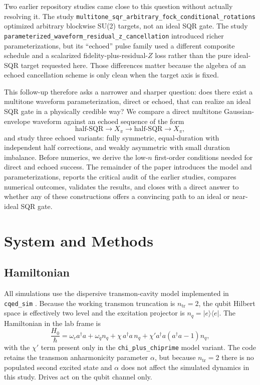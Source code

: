 \documentclass[aps,pra,twocolumn,reprint,floatfix,amsmath,amssymb]{revtex4-2}
\begin{document}
Two earlier repository studies came close to this question without actually resolving it. The study \texttt{multitone\_sqr\_arbitrary\_fock\_conditional\_rotations} optimized arbitrary blockwise SU(2) targets, not an ideal SQR gate. The study \texttt{parameterized\_waveform\_residual\_z\_cancellation} introduced richer parameterizations, but its ``echoed'' pulse family used a different composite schedule and a scalarized fidelity-plus-residual-$Z$ loss rather than the pure ideal-SQR target requested here. Those differences matter because the algebra of an echoed cancellation scheme is only clean when the target axis is fixed.

This follow-up therefore asks a narrower and sharper question: does there exist a multitone waveform parameterization, direct or echoed, that can realize an ideal SQR gate in a physically credible way? We compare a direct multitone Gaussian-envelope waveform against an echoed sequence of the form
\begin{equation}
\text{half-SQR}\rightarrow X_\pi\rightarrow \text{half-SQR}\rightarrow X_\pi,
\end{equation}
and study three echoed variants: fully symmetric, equal-duration with independent half corrections, and weakly asymmetric with small duration imbalance. Before numerics, we derive the low-$n$ first-order conditions needed for direct and echoed success. The remainder of the paper introduces the model and parameterizations, reports the critical audit of the earlier studies, compares numerical outcomes, validates the results, and closes with a direct answer to whether any of these constructions offers a convincing path to an ideal or near-ideal SQR gate.

\section{System and Methods}

\subsection{Hamiltonian}
All simulations use the dispersive transmon-cavity model implemented in \texttt{cqed\_sim} \cite{cqedsim2026}. Because the working transmon truncation is $n_{\mathrm{tr}}=2$, the qubit Hilbert space is effectively two level and the excitation projector is $n_q=|e\rangle\langle e|$. The Hamiltonian in the lab frame is
\begin{equation}
\frac{H_0}{\hbar}
=
\omega_c a^\dagger a
+ \omega_q n_q
+ \chi\, a^\dagger a\, n_q
+ \chi' a^\dagger a (a^\dagger a-1) n_q,
\label{eq:hamiltonian}
\end{equation}
with the $\chi'$ term present only in the \texttt{chi\_plus\_chiprime} model variant. The code retains the transmon anharmonicity parameter $\alpha$, but because $n_{\mathrm{tr}}=2$ there is no populated second excited state and $\alpha$ does not affect the simulated dynamics in this study. Drives act on the qubit channel only.
\end{document}
